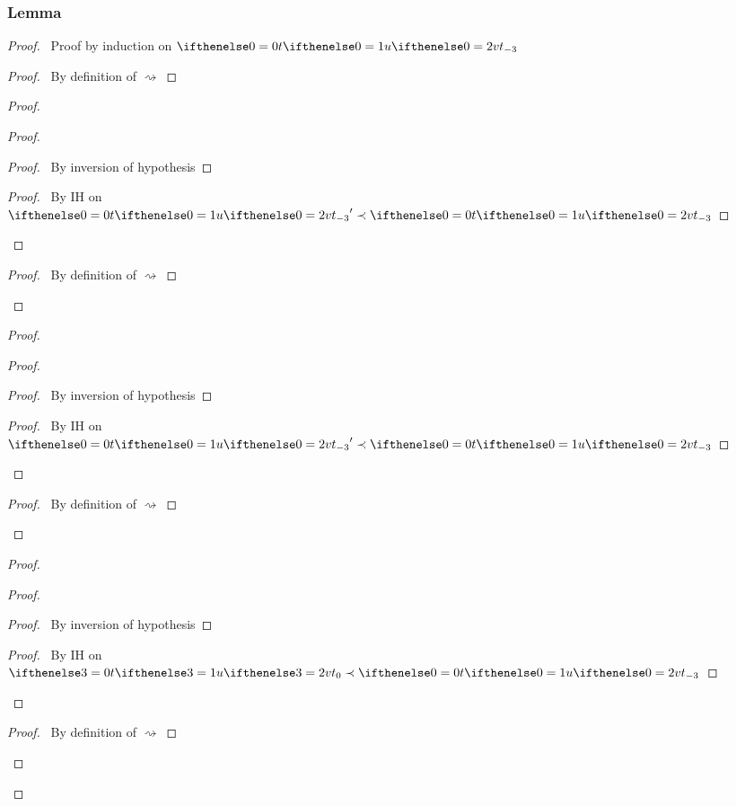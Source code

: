 \documentclass[a4paper]{article}
\begin{document}
\subsubsection{Lemma}\label{lemma-neutral-term}
\begin{proof}
  \prove{$\betaNormal{\aTerm}$}
  \pfsketch\ Proof by induction on $\aTerm$
  \begin{proof}
    \pf\ By definition of $\rightsquigarrow$
  \end{proof}
  \begin{proof}
    \begin{proof}
      \begin{proof}
        \pf\ By inversion of hypothesis
      \end{proof}
      \qedstep
      \begin{proof}
        \pf\ By IH on $\aTerm' \prec \aTerm$
      \end{proof}
    \end{proof}
    \qedstep
    \begin{proof}
      \pf\ By definition of $\rightsquigarrow$
    \end{proof}
  \end{proof}
    \begin{proof}
    \begin{proof}
      \begin{proof}
        \pf\ By inversion of hypothesis
      \end{proof}
      \qedstep
      \begin{proof}
        \pf\ By IH on $\aTerm' \prec \aTerm$
      \end{proof}
    \end{proof}
    \qedstep
    \begin{proof}
      \pf\ By definition of $\rightsquigarrow$
    \end{proof}
  \end{proof}
    \begin{proof}
    \begin{proof}
      \begin{proof}
        \pf\ By inversion of hypothesis
      \end{proof}
      \qedstep
      \begin{proof}
        \pf\ By IH on $\aTerm[3] \prec \aTerm$
      \end{proof}
    \end{proof}
    \qedstep
    \begin{proof}
      \pf\ By definition of $\rightsquigarrow$
    \end{proof}
  \end{proof}
\end{proof}
\end{document}
